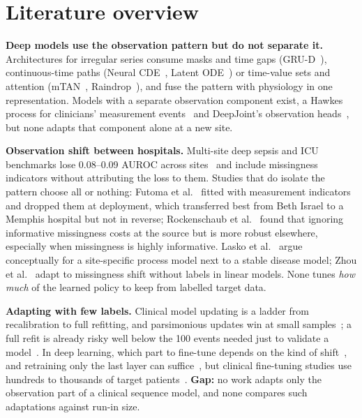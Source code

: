 \documentclass[11pt,a4paper]{article}
\begin{document}
\section{Literature overview}

\textbf{Deep models use the observation pattern but do not separate it.} Architectures for irregular series consume masks and time gaps (GRU-D~\cite{che2018}), continuous-time paths (Neural CDE~\cite{kidger2020}, Latent ODE~\cite{rubanova2019}) or time-value sets and attention (mTAN~\cite{shukla2021}, Raindrop~\cite{zhang2022}), and fuse the pattern with physiology in one representation. Models with a separate observation component exist, a Hawkes process for clinicians' measurement events~\cite{alaa2017} and DeepJoint's observation heads~\cite{jeanselme2022}, but none adapts that component alone at a new site.

\textbf{Observation shift between hospitals.} Multi-site deep sepsis and ICU benchmarks lose 0.08--0.09 AUROC across sites~\cite{moor2023,yaib2024} and include missingness indicators without attributing the loss to them. Studies that do isolate the pattern choose all or nothing: Futoma et al.~\cite{futoma2021} fitted with measurement indicators and dropped them at deployment, which transferred best from Beth Israel to a Memphis hospital but not in reverse; Rockenschaub et al.~\cite{rockenschaub2024} found that ignoring informative missingness costs at the source but is more robust elsewhere, especially when missingness is highly informative. Lasko et al.~\cite{lasko2024} argue conceptually for a site-specific process model next to a stable disease model; Zhou et al.~\cite{zhou2023} adapt to missingness shift without labels in linear models. None tunes \emph{how much} of the learned policy to keep from labelled target data.

\textbf{Adapting with few labels.} Clinical model updating is a ladder from recalibration to full refitting, and parsimonious updates win at small samples~\cite{steyerberg2004,vergouwe2017}; a full refit is already risky well below the 100 events needed just to validate a model~\cite{riley2024}. In deep learning, which part to fine-tune depends on the kind of shift~\cite{lee2023}, and retraining only the last layer can suffice~\cite{kirichenko2023}, but clinical fine-tuning studies use hundreds to thousands of target patients~\cite{moor2023,yaib2024}. \textbf{Gap:} no work adapts only the observation part of a clinical sequence model, and none compares such adaptations against run-in size.
\end{document}

